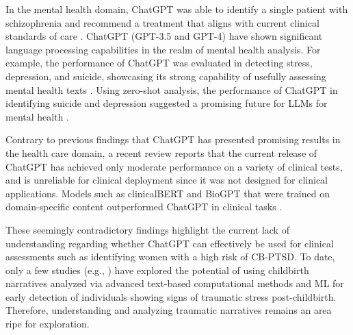 \documentclass[bst/sn-nature]{sn-jnl}%
\theoremstyle{thmstyleone}%
\theoremstyle{thmstyletwo}%
\theoremstyle{thmstylethree}%
\begin{document}
In the mental health domain, ChatGPT was able to identify a single patient with schizophrenia and recommend a treatment that aligns with current clinical standards of care \cite{galido2023case}. 
ChatGPT (GPT-3.5 and GPT-4) have shown significant language processing capabilities in the realm of mental health analysis.
For example, the performance of ChatGPT was evaluated in detecting stress, depression, and suicide, showcasing its strong capability of usefully assessing mental health texts \cite{lamichhane2023evaluation}. 
Using zero-shot analysis, the performance of ChatGPT in identifying suicide and depression suggested a promising future for LLMs for mental health \cite{amin2023will, qin2023chatgpt}.

Contrary to previous findings that ChatGPT has presented promising results in the health care domain, a recent review \cite{li2023chatgpt} reports that the current release of ChatGPT has achieved only moderate performance on a variety of clinical tests, and is unreliable for clinical deployment since it was not designed for clinical applications.
Models such as clinicalBERT \cite{alsentzer2019publicly} and BioGPT \cite{luo2022biogpt} that were trained on domain-specific content outperformed ChatGPT in clinical tasks \cite{li2023chatgpt}.

These seemingly contradictory findings highlight the current lack of understanding regarding whether ChatGPT can effectively be used for clinical assessments such as identifying women with a high risk of CB-PTSD.
To date, only a few studies (e.g., \cite{bartal2023identifying}) have explored the potential of using childbirth narratives analyzed via advanced text-based computational methods and ML for early detection of individuals showing signs of traumatic stress post-childbirth.
Therefore, understanding and analyzing traumatic narratives remains an area ripe for exploration.
\end{document}
